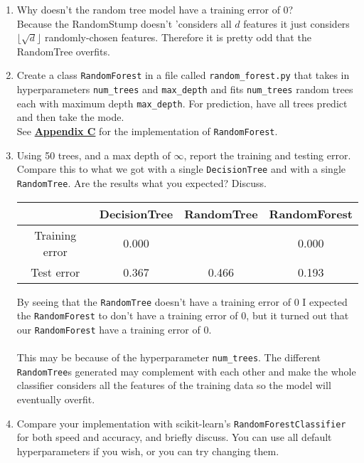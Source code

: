 \documentclass{article}
\def\blu#1{{\color{blu}#1}}
\def\ans#1{{\color{ans}#1}}
\def\enum#1{\begin{enumerate}#1\end{enumerate}}
\begin{document}
\blu{
\enum{
\item Why doesn't the random tree model have a training error of 0? \\
\ans{
   Because the RandomStump doesn't 'considers all $d$ features it just considers 
   $\lfloor \sqrt{d} \rfloor$ randomly-chosen features. Therefore it is pretty odd that the RandomTree 
   overfits.
}
\item Create a class \texttt{RandomForest} in a file called \texttt{random\string_forest.py} that takes in hyperparameters \texttt{num\string_trees} and \texttt{max\string_depth} and
fits \texttt{num\string_trees} random trees each with maximum depth \texttt{max\string_depth}. For prediction, have all trees predict and then take the mode. \\
\ans{
   See \hyperref[appendix:RandomForest]{\textbf{Appendix C}} for the implementation of \texttt{RandomForest}.\\
}
\item Using 50 trees, and a max depth of $\infty$, report the training and testing error. Compare this to what we got with a single \texttt{DecisionTree} and with a single \texttt{RandomTree}. Are the results what you expected? Discuss. \\
\ans{
   \scriptsize
   \setlength{\tabcolsep}{2pt}
   \begin{center}
   \begin{tabular}{SSSS} \toprule
      {} & {DecisionTree} & {RandomTree} & {RandomForest} \\ \midrule
      {Training error} & 0.000 &  &  0.000 \\ 
      {Test error} & 0.367 & 0.466 & 0.193 \\ \bottomrule
   \end{tabular}
   \end{center}
   \normalsize
   By seeing that the \texttt{RandomTree} doesn't have a training error of $0$ I expected the 
   \texttt{RandomForest} to don't have a training error of $0$, but it turned out that
   our \texttt{RandomForest} have a training error of 0. \\ \\ 
   This may be because of the hyperparameter \texttt{num\string_trees}. The different \texttt{RandomTree}s 
   generated may complement with each other and make the whole classifier considers all the features of 
   the training data so the model will eventually overfit.
}
\item Compare your implementation with scikit-learn's \texttt{RandomForestClassifier} for both speed and accuracy, and briefly discuss. You can use all default hyperparameters if you wish, or you can try changing them. \\ \\ \\
}}
\end{document}
